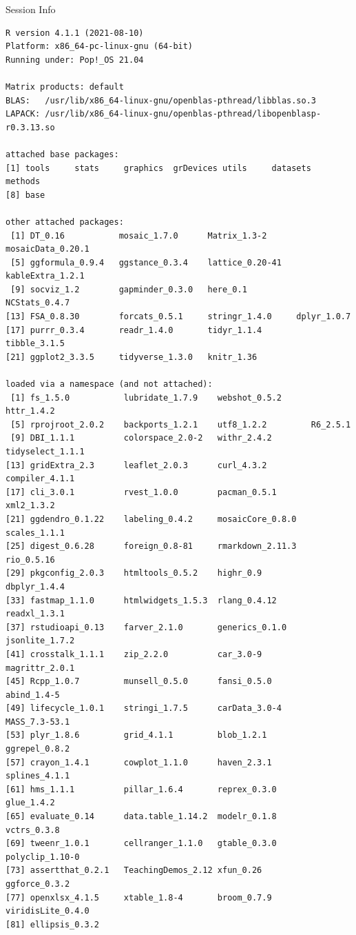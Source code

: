 \documentclass[10pt]{beamer}\usepackage[]{graphicx}\usepackage[]{color}
\makeatletter
\newenvironment{kframe}{%
 \def\at@end@of@kframe{}%
 \ifinner\ifhmode%
  \def\at@end@of@kframe{\end{minipage}}%
  \begin{minipage}{\columnwidth}%
 \fi\fi%
 \def\FrameCommand##1{\hskip\@totalleftmargin \hskip-\fboxsep
 \colorbox{shadecolor}{##1}\hskip-\fboxsep
     \hskip-\linewidth \hskip-\@totalleftmargin \hskip\columnwidth}%
 \MakeFramed {\advance\hsize-\width
   \@totalleftmargin\z@ \linewidth\hsize
   \@setminipage}}%
 {\par\unskip\endMakeFramed%
 \at@end@of@kframe}
\newenvironment{knitrout}{}{} %
\makeatother
\begin{document}
\begin{frame}[fragile]{Session Info}
	\tiny
	
\begin{knitrout}\tiny
{}\color{fgcolor}\begin{kframe}
\begin{verbatim}
R version 4.1.1 (2021-08-10)
Platform: x86_64-pc-linux-gnu (64-bit)
Running under: Pop!_OS 21.04

Matrix products: default
BLAS:   /usr/lib/x86_64-linux-gnu/openblas-pthread/libblas.so.3
LAPACK: /usr/lib/x86_64-linux-gnu/openblas-pthread/libopenblasp-r0.3.13.so

attached base packages:
[1] tools     stats     graphics  grDevices utils     datasets  methods  
[8] base     

other attached packages:
 [1] DT_0.16           mosaic_1.7.0      Matrix_1.3-2      mosaicData_0.20.1
 [5] ggformula_0.9.4   ggstance_0.3.4    lattice_0.20-41   kableExtra_1.2.1 
 [9] socviz_1.2        gapminder_0.3.0   here_0.1          NCStats_0.4.7    
[13] FSA_0.8.30        forcats_0.5.1     stringr_1.4.0     dplyr_1.0.7      
[17] purrr_0.3.4       readr_1.4.0       tidyr_1.1.4       tibble_3.1.5     
[21] ggplot2_3.3.5     tidyverse_1.3.0   knitr_1.36       

loaded via a namespace (and not attached):
 [1] fs_1.5.0           lubridate_1.7.9    webshot_0.5.2      httr_1.4.2        
 [5] rprojroot_2.0.2    backports_1.2.1    utf8_1.2.2         R6_2.5.1          
 [9] DBI_1.1.1          colorspace_2.0-2   withr_2.4.2        tidyselect_1.1.1  
[13] gridExtra_2.3      leaflet_2.0.3      curl_4.3.2         compiler_4.1.1    
[17] cli_3.0.1          rvest_1.0.0        pacman_0.5.1       xml2_1.3.2        
[21] ggdendro_0.1.22    labeling_0.4.2     mosaicCore_0.8.0   scales_1.1.1      
[25] digest_0.6.28      foreign_0.8-81     rmarkdown_2.11.3   rio_0.5.16        
[29] pkgconfig_2.0.3    htmltools_0.5.2    highr_0.9          dbplyr_1.4.4      
[33] fastmap_1.1.0      htmlwidgets_1.5.3  rlang_0.4.12       readxl_1.3.1      
[37] rstudioapi_0.13    farver_2.1.0       generics_0.1.0     jsonlite_1.7.2    
[41] crosstalk_1.1.1    zip_2.2.0          car_3.0-9          magrittr_2.0.1    
[45] Rcpp_1.0.7         munsell_0.5.0      fansi_0.5.0        abind_1.4-5       
[49] lifecycle_1.0.1    stringi_1.7.5      carData_3.0-4      MASS_7.3-53.1     
[53] plyr_1.8.6         grid_4.1.1         blob_1.2.1         ggrepel_0.8.2     
[57] crayon_1.4.1       cowplot_1.1.0      haven_2.3.1        splines_4.1.1     
[61] hms_1.1.1          pillar_1.6.4       reprex_0.3.0       glue_1.4.2        
[65] evaluate_0.14      data.table_1.14.2  modelr_0.1.8       vctrs_0.3.8       
[69] tweenr_1.0.1       cellranger_1.1.0   gtable_0.3.0       polyclip_1.10-0   
[73] assertthat_0.2.1   TeachingDemos_2.12 xfun_0.26          ggforce_0.3.2     
[77] openxlsx_4.1.5     xtable_1.8-4       broom_0.7.9        viridisLite_0.4.0 
[81] ellipsis_0.3.2    
\end{verbatim}
\end{kframe}
\end{knitrout}
	
\end{frame}
\end{document}
